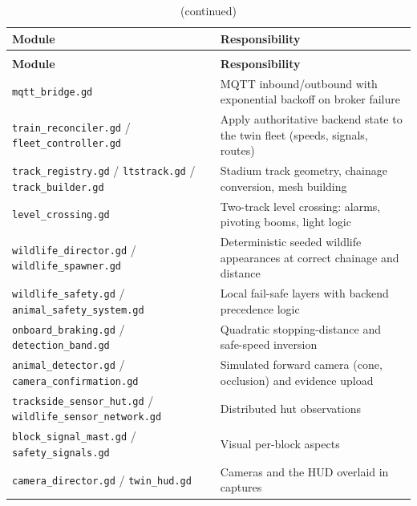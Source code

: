 \begin{longtable}{>{\raggedright}p{4.0cm} >{\raggedright\arraybackslash}p{11.6cm}}
\caption{Key \texttt{godot/src} modules}\label{tab:twinmodules}\\
\toprule
\textbf{Module} & \textbf{Responsibility} \\
\midrule
\endfirsthead
\caption[]{(continued)}\\
\toprule
\textbf{Module} & \textbf{Responsibility} \\
\midrule
\endhead
\texttt{mqtt\_bridge.gd} & MQTT inbound/outbound with exponential backoff on broker failure \\
\texttt{train\_reconciler.gd} / \texttt{fleet\_controller.gd} & Apply authoritative backend state to the twin fleet (speeds, signals, routes) \\
\texttt{track\_registry.gd} / \texttt{ltstrack.gd} / \texttt{track\_builder.gd} & Stadium track geometry, chainage conversion, mesh building \\
\texttt{level\_crossing.gd} & Two-track level crossing: alarms, pivoting booms, light logic \\
\texttt{wildlife\_director.gd} / \texttt{wildlife\_spawner.gd} & Deterministic seeded wildlife appearances at correct chainage and distance \\
\texttt{wildlife\_safety.gd} / \texttt{animal\_safety\_system.gd} & Local fail-safe layers with backend precedence logic \\
\texttt{onboard\_braking.gd} / \texttt{detection\_band.gd} & Quadratic stopping-distance and safe-speed inversion \\
\texttt{animal\_detector.gd} / \texttt{camera\_confirmation.gd} & Simulated forward camera (cone, occlusion) and evidence upload \\
\texttt{trackside\_sensor\_hut.gd} / \texttt{wildlife\_sensor\_network.gd} & Distributed hut observations \\
\texttt{block\_signal\_mast.gd} / \texttt{safety\_signals.gd} & Visual per-block aspects \\
\texttt{camera\_director.gd} / \texttt{twin\_hud.gd} & Cameras and the HUD overlaid in captures \\
\bottomrule
\end{longtable}
